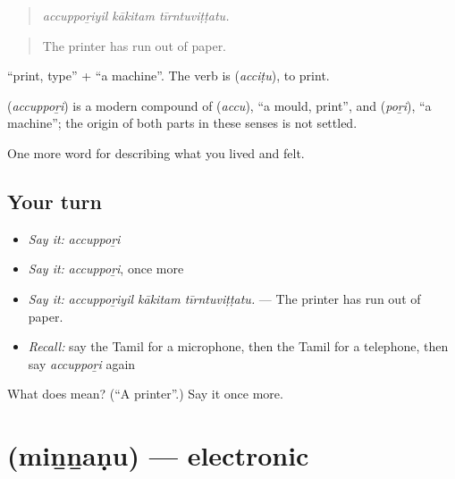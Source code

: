 \begin{quote}
\emph{accuppoṟiyil kākitam tīrntuviṭṭatu.}
\end{quote}

\begin{quote}
The printer has run out of paper.
\end{quote}

 \textquotedblleft{}print, type\textquotedblright{} +  \textquotedblleft{}a machine\textquotedblright{}. The verb is  (\emph{acciṭu}), to print.

\begin{cousinweb}
\textbf{} (\emph{accuppoṟi}) is a modern compound of  (\emph{accu}), \textquotedblleft{}a mould, print\textquotedblright{}, and  (\emph{poṟi}), \textquotedblleft{}a machine\textquotedblright{}; the origin of both parts in these senses is not settled.
\end{cousinweb}

\begin{grammarlens}[title={What you've built}]
One more word for describing what you lived and felt.
\end{grammarlens}

\subsection*{Your turn}
\begin{itemize}
\raggedright
  \item \emph{Say it:} \emph{accuppoṟi}
  \item \emph{Say it:} \emph{accuppoṟi}, once more
  \item \emph{Say it:} \emph{accuppoṟiyil kākitam tīrntuviṭṭatu.} — The printer has run out of paper.
  \item \emph{Recall:} say the Tamil for a microphone, then the Tamil for a telephone, then say \emph{accuppoṟi} again
\end{itemize}

\begin{tcolorbox}[breakable,colback=teal!4,colframe=teal!35!black,title={Before you move on}]
What does  mean? (\textquotedblleft{}A printer\textquotedblright{}.) Say it once more.
\end{tcolorbox}
\section[\texorpdfstring{\ta{மின்னணு} (miṉṉaṇu)}{மின்னணு (miṉṉaṇu)}]{ (miṉṉaṇu) — electronic}

